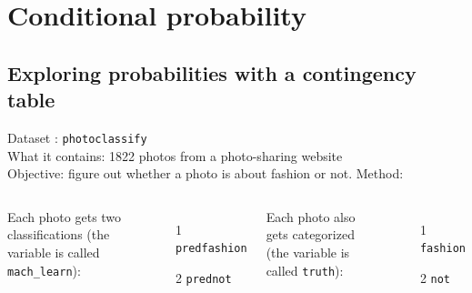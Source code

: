 \documentclass[notes,11pt, aspectratio=169]{beamer}
\begin{document}

\section{Conditional probability}


\subsection{Exploring probabilities with a contingency table}


\begin{frame}


\newcommand{\fashN}{1822}
\newcommand{\fashYY}{197}
\newcommand{\fashYN}{22}
\newcommand{\fashYA}{219}
\newcommand{\fashNY}{112}
\newcommand{\fashNN}{1491}
\newcommand{\fashNA}{1603}
\newcommand{\fashAY}{309}
\newcommand{\fashAN}{1513}
\newcommand{\fashAA}{\fashN{}}
\newcommand{\fashCYPY}{0.96}
\newcommand{\fashCYPN}{0.04}
\newcommand{\fashCNPY}{0.07}
\newcommand{\fashCNPN}{0.93}

\begin{tcolorbox}[colback = textboxgreen!75]
Dataset : \texttt{photoclassify} \\
What it contains: 1822 photos from a photo-sharing website \\
Objective: figure out whether a photo is about fashion or not. 
Method:  \\
\begin{columns}
 Each photo gets two classifications (the variable is called \texttt{mach\_learn}):
          \begin{itemize}
          \item[1] \texttt{predfashion}
          \item[2] \texttt{prednot}
          \end{itemize}
 Each photo also gets categorized (the variable is called \texttt{truth}):
          \begin{itemize}
           \item[1] \texttt{fashion}
           \item[2] \texttt{not}
           \end{itemize}
\end{columns}
\end{tcolorbox}


\end{frame}
\end{document}
